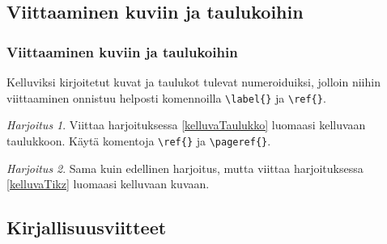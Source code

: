 \documentclass[handout,hyperref={colorlinks=true}]{beamer}
\theoremstyle{remark}
\newtheorem{harj}{Harjoitus}[section]
\newcommand{\vaihto}{\\ \vspace{10pt}}
\begin{document}
\subsection{Viittaaminen kuviin ja taulukoihin}
\begin{frame}[fragile]
    \frametitle{Viittaaminen kuviin ja taulukoihin}
    Kelluviksi kirjoitetut kuvat ja taulukot tulevat numeroiduiksi, jolloin niihin viittaaminen onnistuu helposti komennoilla \verb-\label{}- ja \verb-\ref{}-. 
    \begin{harj}
        Viittaa harjoituksessa \ref{kelluvaTaulukko} luomaasi kelluvaan taulukkoon. Käytä komentoja \verb-\ref{}- ja \verb-\pageref{}-.
        \vaihto
    \end{harj}
    \begin{harj}
        Sama kuin edellinen harjoitus, mutta viittaa harjoituksessa \ref{kelluvaTikz} luomaasi kelluvaan kuvaan.
    \end{harj}
\end{frame}
\subsection{Kirjallisuusviitteet}
\end{document}
